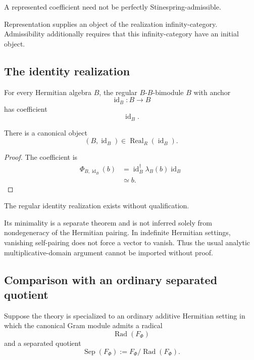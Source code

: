\begin{remark}
\label{rem:higher-represented-not-automatically-admissible}
A represented coefficient need not be perfectly Stinespring-admissible.

Representation supplies an object of the realization infinity-category.
Admissibility additionally requires that this infinity-category have an
initial object.
\end{remark}

\subsection{The identity realization}

For every Hermitian algebra \(B\), the regular \(B\)-\(B\)-bimodule \(B\)
with anchor
\[
  \operatorname{id}_B:B\to B
\]
has coefficient
\[
  \operatorname{id}_B.
\]

\begin{proposition}
\label{prop:higher-regular-identity-realization}
There is a canonical object
\[
  (B,\operatorname{id}_B)
  \in
  \operatorname{Real}_R(\operatorname{id}_B).
\]
\end{proposition}

\begin{proof}
The coefficient is
\[
\begin{aligned}
  \Phi_{B,\operatorname{id}_B}(b)
  &=
  \operatorname{id}_B^\dagger
  \lambda_B(b)
  \operatorname{id}_B
  \\
  &\simeq
  b.
\end{aligned}
\]
\end{proof}

\begin{remark}
\label{rem:higher-identity-minimality-boundary}
The regular identity realization exists without qualification.

Its minimality is a separate theorem and is not inferred solely from
nondegeneracy of the Hermitian pairing. In indefinite Hermitian settings,
vanishing self-pairing does not force a vector to vanish. Thus the usual
analytic multiplicative-domain argument cannot be imported without proof.
\end{remark}

\subsection{Comparison with an ordinary separated quotient}

Suppose the theory is specialized to an ordinary additive Hermitian setting
in which the canonical Gram module admits a radical
\[
  \operatorname{Rad}(F_\Phi)
\]
and a separated quotient
\[
  \operatorname{Sep}(F_\Phi)
  :=
  F_\Phi/\operatorname{Rad}(F_\Phi).
\]

